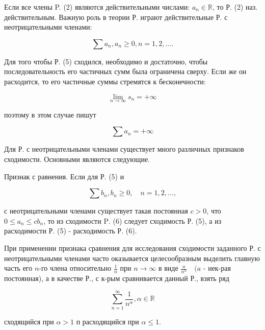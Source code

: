 \documentclass[10pt]{article}
\begin{document}
Если все члены P. (2) являются действительными числами: $a_{n} \in \mathbb{R}$, то Р. (2) наз. действительным. Важную роль в теории Р. играют действительные Р. с неотрицательными членами:



\[

\sum a_{n}, a_{n} \geqslant 0, n=1,2, \ldots .

\]



Для того чтобы Р. (5) сходился, необходимо и достаточно, чтобы последовательность его частичных сумм была ограничена сверху. Если же он расходится, то его частичные суммы стремятся к бесконечности:



\[

\lim _{n \rightarrow \infty} s_{n}=+\infty

\]



поэтому в этом случае пишут



\[

\sum a_{n}=+\infty

\]



Для Р. с неотрицательными членами существует много различных признаков сходимости. Основными являются следующие.



Признак с равнения. Если для Р. (5) и



\[

\sum b_{n}, b_{n} \geqslant 0, \quad n=1,2, \ldots,

\]



с неотрицательными членами существует такая постоянная $c>0$, что $0 \leqslant a_{n} \leqslant c b_{n}$, то из сходимости $\mathrm{P}$. (6) следует сходимость Р. (5), а из расходимости Р. (5) - расходимость Р. (6).



При применении признака сравнения для исследования сходимости заданного Р. с неотрицательными членами часто оказывается целесообразным выделить главную часть его $n$-го члена относительно $\frac{1}{n}$ при $n \rightarrow \infty$ в виде $\frac{a}{n^{\alpha}} \quad(a$ - нек-рая постоянная), а в качестве Р., с к-рым сравнивается данный Р., взять ряд



\[

\sum_{n=1}^{\infty} \frac{1}{n^{\alpha}}, \alpha \in \mathbb{R}

\]



сходящийся при $\alpha>1$ п расходящийся при $\alpha \leqslant 1$.
\end{document}
